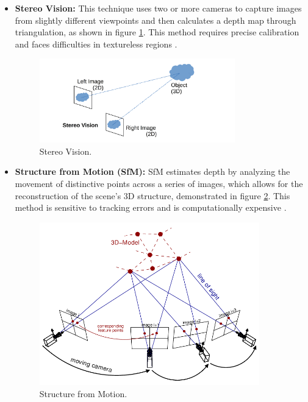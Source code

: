 \begin{itemize}
    \item \textbf{Stereo Vision:} This technique uses two or more cameras to capture images from slightly different viewpoints and then calculates a depth map through triangulation, as shown in figure \ref{fig:stereo_vision_diagram}. This method requires precise calibration and faces difficulties in textureless regions \cite{scharstein2002taxonomy}.
    
    \begin{figure}[htbp!]
        \centering
        \includegraphics[width=0.8\textwidth]{images/stereo_vision.png}
        \caption{Stereo Vision.}
        \label{fig:stereo_vision_diagram}
    \end{figure}

    \item \textbf{Structure from Motion (SfM):} SfM estimates depth by analyzing the movement of distinctive points across a series of images, which allows for the reconstruction of the scene's 3D structure, demonstrated in figure \ref{fig:sfm_diagram}. This method is sensitive to tracking errors and is computationally expensive \cite{hartley2003multiple,saxena20083}.
    
    \begin{figure}[htbp!]
        \centering
        \includegraphics[width=0.9\textwidth]{images/sfm_diagram.png}
        \caption{Structure from Motion.}
        \label{fig:sfm_diagram}
    \end{figure}


\end{itemize}
